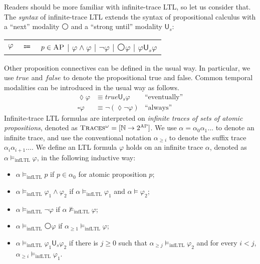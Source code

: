 \documentclass[acmsmall]{acmart}
\newcommand{\AP}{\textsc{AP}}
\newcommand{\true}{\mathit{true}}
\newcommand{\false}{\mathit{false}}
\newcommand{\wnext}{{\medcirc}}
\newcommand{\always}{{\square}}
\newcommand{\eventually}{{\lozenge}}
\newcommand{\Us}{\mathbin{\mathsf{U}_s}}
\newcommand{\infTraces}{\textsc{Traces$^\omega$}\xspace}
\newcommand{\NN}{\mathbb{N}}
\newcommand{\pset}[1]{2^{#1}}
\newcommand{\infLTL}{\mathrm{infLTL}}
\begin{document}
Readers should be more familiar with infinite-trace LTL, 
so let us consider that.
The \emph{syntax} of infinite-trace LTL 
extends the syntax of propositional calculus
with a ``next'' modality $\wnext$ 
and a ``strong until'' modality $\mathsf{U}_s$:
\begin{center}
\begin{tabular}{crl}
$\varphi$ & $\Coloneqq$ & $p \in \AP$
          $|$ $\varphi \wedge \varphi$
          $|$ $\neg \varphi$
          $|$ $\wnext \varphi$
          $|$ $\varphi \Us \varphi$
\end{tabular}
\end{center}
Other proposition connectives can be defined in the usual way.
In particular, we use $\true$ and $\false$ to denote
the propositional true and false.
Common temporal modalities can be introduced in the usual way as follows.
\begin{align*}
\eventually \varphi &\equiv \true \Us \varphi
& \text{``eventually''}
\\
\always \varphi &\equiv \neg (\eventually \neg \varphi)
& \text{``always''}
\end{align*}
Infinite-trace LTL formulas are interpreted on 
\emph{infinite traces of sets of atomic propositions},
denoted as $\infTraces = [ \NN \to \pset{\AP}]$.
We use $\alpha = \alpha_0\alpha_1\dots$
to denote an infinite trace,
and use the conventional notation
$\alpha_{\ge i}$ to denote the suffix trace
$\alpha_i \alpha_{i+1} \dots$.
We define an LTL formula $\varphi$ holds on an infinite trace $\alpha$,
denoted as $\alpha \vDash_\infLTL \varphi$, 
in the following inductive way:
\begin{itemize}
\item $\alpha \vDash_\infLTL p$ if $p \in \alpha_0$ for atomic proposition $p$;
\item $\alpha \vDash_\infLTL \varphi_1 \wedge \varphi_2$
      if $\alpha \vDash_\infLTL \varphi_1$ and $\alpha \vDash \varphi_2$;
\item $\alpha \vDash_\infLTL \neg \varphi$
      if $\alpha \not\vDash_\infLTL \varphi$;
\item $\alpha  \vDash_\infLTL \wnext \varphi$
      if $\alpha_{\ge 1} \vDash_\infLTL \varphi$;
\item $\alpha \vDash_\infLTL \varphi_1 \Us \varphi_2$
      if there is $j \ge 0$ such that
      $\alpha_{\ge j} \vDash_\infLTL \varphi_2$ and for every $i < j$,
      $\alpha_{\ge i} \vDash_\infLTL \varphi_1$.
\end{itemize}
\end{document}
